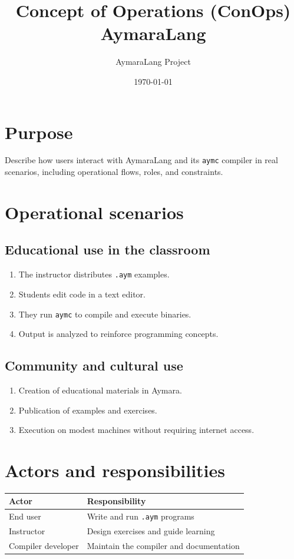 \documentclass[11pt,a4paper]{article}
\title{Concept of Operations (ConOps)\\AymaraLang}
\author{AymaraLang Project}
\date{\today}
\begin{document}
\maketitle

\section{Purpose}
Describe how users interact with AymaraLang and its \texttt{aymc} compiler in real scenarios, including operational flows, roles, and constraints.

\section{Operational scenarios}
\subsection{Educational use in the classroom}
\begin{enumerate}
    \item The instructor distributes \texttt{.aym} examples.
    \item Students edit code in a text editor.
    \item They run \texttt{aymc} to compile and execute binaries.
    \item Output is analyzed to reinforce programming concepts.
\end{enumerate}

\subsection{Community and cultural use}
\begin{enumerate}
    \item Creation of educational materials in Aymara.
    \item Publication of examples and exercises.
    \item Execution on modest machines without requiring internet access.
\end{enumerate}

\section{Actors and responsibilities}
\begin{longtable}{@{}p{4cm}p{9cm}@{}}
\toprule
\textbf{Actor} & \textbf{Responsibility} \\ \midrule
End user & Write and run \texttt{.aym} programs \\
Instructor & Design exercises and guide learning \\
Compiler developer & Maintain the compiler and documentation \\ \bottomrule
\end{longtable}
\end{document}
